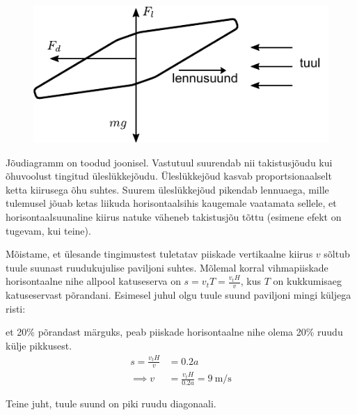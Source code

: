 \documentclass[10pt]{article}
\begin{document}

\solu
\

\begin{figure}[h]
    \centering
    \includegraphics[]{2022-v3g-01-yl.pdf}
\end{figure}

Jõudiagramm on toodud joonisel. Vastutuul suurendab nii takistusjõudu kui õhuvoolust tingitud üleslükkejõudu. Üleslükkejõud kasvab proportsionaalselt ketta kiirusega õhu suhtes. Suurem üleslükkejõud pikendab lennuaega, mille tulemusel jõuab ketas liikuda horisontaalsihis kaugemale vaatamata sellele, et horisontaalsuunaline kiirus natuke väheneb takistusjõu tõttu (esimene efekt on tugevam, kui teine).
\probend
\bigskip


\solu
Mõistame, et ülesande tingimustest tuletatav piiskade vertikaalne kiirus $v$ sõltub tuule suunast ruudukujulise paviljoni suhtes. Mõlemal korral vihmapiiskade horisontaalne nihe allpool katuseserva on $s = v_t T = \frac{v_t H}{v}$, kus $T$ on kukkumisaeg katuseservast põrandani. Esimesel juhul olgu tuule suund paviljoni mingi küljega risti:

\osa et 20\% põrandast märguks, peab piiskade horisontaalne nihe olema 20\% ruudu külje pikkusest.
\begin{align*}
    s = \frac{v_t H}{v} &= 0.2a \\
    \implies v &= \frac{v_t H}{0.2a} = \SI{9}{\meter\per\second}
\end{align*}

\osa Teine juht, tuule suund on piki ruudu diagonaali.

\end{document}
